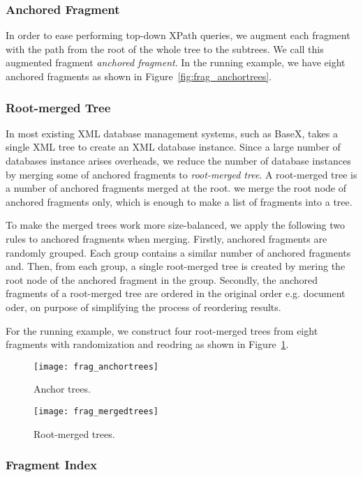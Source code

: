 \subsubsection{Anchored Fragment}

In order to ease performing top-down XPath queries, we augment each fragment
with the path from the root of the whole tree to the subtrees. We call this
augmented fragment  \emph{anchored fragment}. In the running example, we have
eight anchored fragments as shown in Figure~\ref{fig:frag_anchortrees}.



\subsubsection{Root-merged Tree}

In most existing XML database management systems, such as BaseX, takes a  single
XML tree to create an XML database instance. Since a large number of  databases
instance arises overheads, we reduce the number of database  instances by
merging some of anchored fragments to \emph{root-merged tree}. A root-merged
tree is a number of anchored fragments merged at the root. we merge the root
node of anchored fragments only, which is enough to make a list of fragments
into a tree. 

To make the merged trees work more size-balanced, we apply the following two
rules to anchored fragments when merging. Firstly, anchored fragments are randomly
grouped. Each group contains a similar number of anchored fragments and. Then,
from each group, a single root-merged tree is created by mering the root node 
of the anchored fragment in the group. Secondly,
the anchored fragments of a root-merged tree are ordered in the original order
e.g. document oder, on purpose of simplifying the process of reordering results.

For the running example, we construct four root-merged trees from eight
fragments with randomization and reodring as shown in Figure~\ref{fig:frag_mergedtrees}. 

\begin{figure}[t]   
	\texttt{[image: frag\_anchortrees]}
	\caption{Anchor trees.}
	\label{fig:frag_anchortrees}	
	
	\texttt{[image: frag\_mergedtrees]}
	\caption{Root-merged trees.}
	\label{fig:frag_mergedtrees}
\end{figure}


\subsubsection{Fragment Index}

